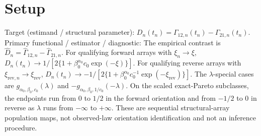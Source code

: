 \documentclass{article}
\begin{document}
\section{Setup}

Target (estimand / structural parameter): \(D_n(t_n)=\Gamma_{12,n}(t_n)-\Gamma_{21,n}(t_n)\).
Primary functional / estimator / diagnostic: The empirical contrast is \(\widehat D_n=\widehat\Gamma_{12,n}-\widehat\Gamma_{21,n}\). For qualifying forward arrays with \(\xi_n\to\xi\), \(D_n(t_n)\to1/[2\{1+\beta_0^{\alpha_0}c_0\exp(-\xi)\}]\). For qualifying reverse arrays with \(\xi_{\mathrm{rev},n}\to\xi_{\mathrm{rev}}\), \(D_n(t_n)\to-1/[2\{1+\beta_0^{\alpha_0}c_0^{-1}\exp(-\xi_{\mathrm{rev}})\}]\). The \(\lambda\)-special cases are \(g_{\alpha_0,\beta_0,c_0}(\lambda)\) and \(-g_{\alpha_0,\beta_0,1/c_0}(-\lambda)\). On the scaled exact-Pareto subclasses, the endpoints run from \(0\) to \(1/2\) in the forward orientation and from \(-1/2\) to \(0\) in reverse as \(\lambda\) runs from \(-\infty\) to \(+\infty\). These are sequential structural-array population maps, not observed-law orientation identification and not an inference procedure.
\end{document}
